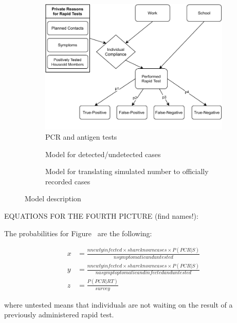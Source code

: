 \begin{figure}[!tp]
\begin{subfigure}[b]{0.425\textwidth}
        \includegraphics[width=\textwidth]{../figures/model-graph-bottom-left}
        \caption{{\small PCR and antigen tests}}
        \label{fig:pcr_antigen_tests}
    \end{subfigure}
    \hfill
    \begin{subfigure}[b]{0.425\textwidth}
        \centering

        Model for detected/undetected cases

        \caption{{\small Model for translating simulated number to officially recorded cases}}
        \label{fig:model_for_official_cases}
    \end{subfigure}

    \caption{Model description}
    \label{fig:model-description}

\end{figure}

EQUATIONS FOR THE FOURTH PICTURE (find names!):

The probabilities for Figure~ are the following:

\begin{align*}
    x &= \frac{nnewlyinfected \times shareknowncases \times P(PCR | S)}{nsymptomaticanduntested} \\
    y &= \frac{nnewlyinfected \times shareknowncases \times P(PCR | S)}{nasymptoptomaticandinfectedanduntested} \\
    z &= \frac{P(PCR | RT)}{survey}
\end{align*}

where untested means that individuals are not waiting on the result of a previously administered rapid test.

